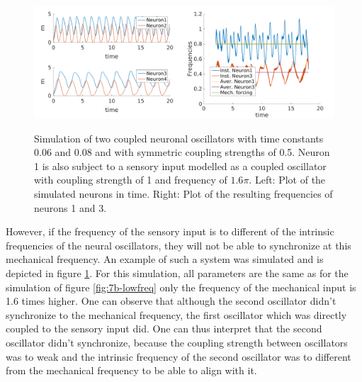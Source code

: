 \documentclass[a4paper]{scrartcl}
\begin{document}
\begin{figure}[!b]
	\centering
	\includegraphics[width=0.5\textwidth]{fig/figure7b_highfreq-simu.png}\includegraphics[width=0.5\textwidth]{fig/figure7b_highfreq-freq.png}
	\caption{Simulation of two coupled neuronal oscillators with time constants 0.06 and 0.08 and with symmetric coupling strengths of 0.5. Neuron 1 is also subject to a sensory input modelled as a coupled oscillator with coupling strength of 1 and frequency of $1.6\pi$. Left: Plot of the simulated neurons in time. Right: Plot of the resulting frequencies of neurons 1 and 3.}
	\label{fig:7b-highfreq}
\end{figure}

However, if the frequency of the sensory input is to different of the intrinsic frequencies of the neural oscillators, they will not be able to synchronize at this mechanical frequency. An example of such a system was simulated and is depicted in figure \ref{fig:7b-highfreq}. For this simulation, all parameters are the same as for the simulation of figure \ref{fig:7b-lowfreq} only the frequency of the mechanical input is 1.6 times higher. One can observe that although the second oscillator didn't synchronize to the mechanical frequency, the first oscillator which was directly coupled to the sensory input did. One can thus interpret that the second oscillator didn't synchronize, because the coupling strength between oscillators was to weak and the intrinsic frequency of the second oscillator was to different from the mechanical frequency to be able to align with it.
\end{document}
